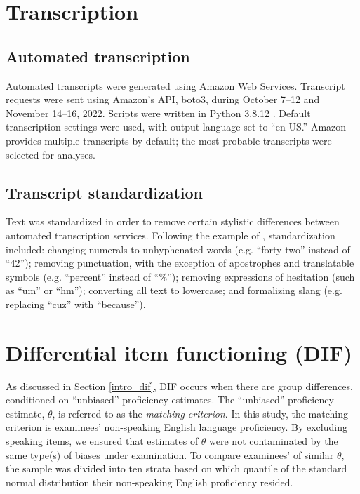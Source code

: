 \documentclass [PhD] {uclathes}
\begin{document}
\section{Transcription}

\subsection{Automated transcription}
\label{meth_auto_transcribe}

Automated transcripts were generated using Amazon Web Services. Transcript requests were sent using Amazon’s API, boto3, during October 7–12 and November 14–16, 2022. Scripts were written in Python 3.8.12 \citep{python2022}. Default transcription settings were used, with output language set to “en-US.” Amazon provides multiple transcripts by default; the most probable transcripts were selected for analyses.

\subsection{Transcript standardization}
\label{sec:meth_text_standardization}

Text was standardized in order to remove certain stylistic differences between automated transcription services. Following the example of \cite{koenecke2020}, standardization included: changing numerals to unhyphenated words (e.g. “forty two” instead of “42”); removing punctuation, with the exception of apostrophes and translatable symbols (e.g. “percent” instead of “\%”); removing expressions of hesitation (such as “um” or “hm”); converting all text to lowercase; and formalizing slang (e.g. replacing “cuz” with “because”).

\section{Differential item functioning (DIF)}
\label{meth_dif}

As discussed in Section \ref{intro_dif}, DIF occurs when there are group differences, conditioned on “unbiased” proficiency estimates. The “unbiased” proficiency estimate, $\theta$, is referred to as the \emph{matching criterion}. In this study, the matching criterion is examinees’ non-speaking English language proficiency. By excluding speaking items, we ensured that estimates of $\theta$ were not contaminated by the same type(s) of biases under examination. To compare examinees’ of similar $\theta$, the sample was divided into ten strata based on which quantile of the standard normal distribution their non-speaking English proficiency resided.
\end{document}
